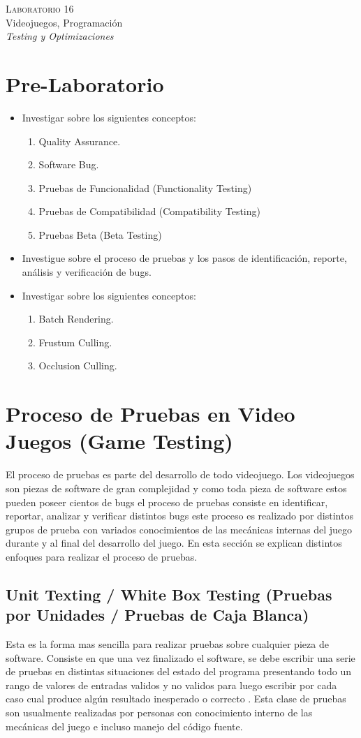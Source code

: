 \begin{center}
\textsc{\Large Laboratorio 16}~\\
{\large Videojuegos, Programación}~\\
\emph{Testing y Optimizaciones}
\end{center}

\section{Pre-Laboratorio}

\begin{itemize}
\item Investigar sobre los siguientes conceptos:
\begin{enumerate}
\item Quality Assurance.
\item Software Bug.
\item Pruebas de Funcionalidad (Functionality Testing)
\item Pruebas de Compatibilidad (Compatibility Testing)
\item Pruebas Beta (Beta Testing)
\end{enumerate}
\item Investigue sobre el proceso de pruebas y los pasos de identificación, reporte, análisis y verificación de bugs.
\item Investigar sobre los siguientes conceptos:
\begin{enumerate}
\item Batch Rendering.
\item Frustum Culling.
\item Occlusion Culling.
\end{enumerate}
\end{itemize}
\section{Proceso de Pruebas en Video Juegos (Game Testing)}
El proceso de pruebas es parte del desarrollo de todo videojuego. Los videojuegos son piezas de software de gran complejidad y como toda pieza de software estos pueden poseer cientos de bugs el proceso de pruebas consiste en identificar, reportar, analizar y verificar distintos bugs este proceso es realizado por distintos grupos de prueba con variados conocimientos de las mecánicas internas del juego durante y al final del desarrollo del juego. En esta sección se explican distintos enfoques para realizar el proceso de pruebas.
\subsection{Unit Texting / White Box Testing (Pruebas por Unidades / Pruebas de Caja Blanca)}
Esta es la forma mas sencilla para realizar pruebas sobre cualquier pieza de software. Consiste en que una vez finalizado el software, se debe escribir una serie de pruebas en distintas situaciones del estado del programa presentando todo un rango de valores de entradas validos y no validos para luego escribir por cada caso cual produce algún resultado inesperado o correcto \cite[p.~155]{erikgamedevelopment}. Esta clase de pruebas son usualmente realizadas por personas con conocimiento interno de las mecánicas del juego e incluso manejo del código fuente.
